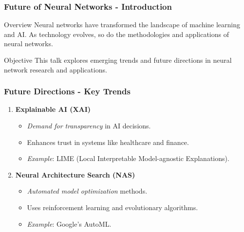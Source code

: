 \documentclass[aspectratio=169]{beamer}
\begin{document}
\begin{frame}[fragile]
    \frametitle{Future of Neural Networks - Introduction}
    \begin{block}{Overview}
        Neural networks have transformed the landscape of machine learning and AI. As technology evolves, so do the methodologies and applications of neural networks.
    \end{block}
    \begin{block}{Objective}
        This talk explores emerging trends and future directions in neural network research and applications.
    \end{block}
\end{frame}

\begin{frame}[fragile]
    \frametitle{Future Directions - Key Trends}
    \begin{enumerate}
        \item \textbf{Explainable AI (XAI)}
        \begin{itemize}
            \item \textit{Demand for transparency} in AI decisions.
            \item Enhances trust in systems like healthcare and finance.
            \item \textit{Example}: LIME (Local Interpretable Model-agnostic Explanations).
        \end{itemize}

        \item \textbf{Neural Architecture Search (NAS)}
        \begin{itemize}
            \item \textit{Automated model optimization} methods.
            \item Uses reinforcement learning and evolutionary algorithms.
            \item \textit{Example}: Google’s AutoML.
        \end{itemize}
    \end{enumerate}
\end{frame}
\end{document}
